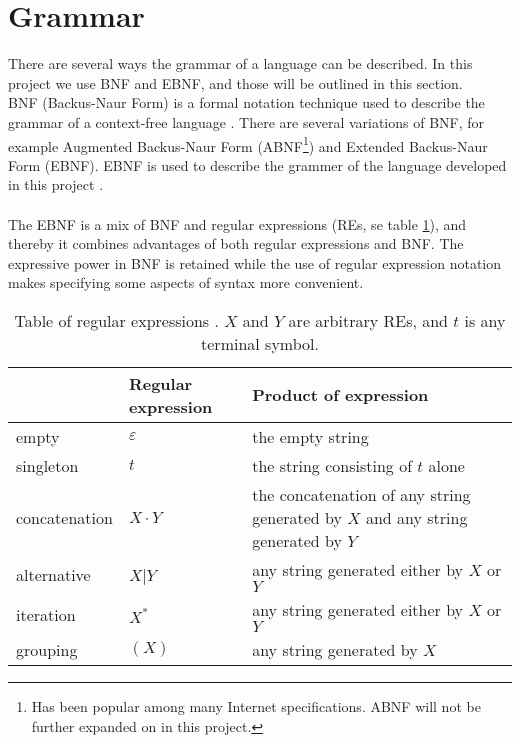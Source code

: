 \section{Grammar}
\label{sec:ebnf}

There are several ways the grammar of a language can be described. In this project we use BNF and EBNF, and those will be outlined in this section.\\ \indent
BNF (Backus-Naur Form) is a formal notation technique used to describe the grammar of a context-free language \cite{misc:ss}. There are several variations of BNF, for example Augmented Backus-Naur Form (ABNF\footnote{Has been popular among many
   Internet specifications. ABNF will not be further expanded on in this project.}) and Extended Backus-Naur Form (EBNF). EBNF is used to describe the grammer of the language developed in this project \cite{misc:spo}.\\
\\
The EBNF is a mix of BNF and regular expressions (REs, se table \ref{tab:re}), and thereby it combines advantages of both regular expressions and BNF. The expressive power in BNF is retained while the use of regular expression notation makes specifying some aspects of syntax more convenient.

\begin{center}
	\begin{table}[H]
    \begin{tabular}{ | l | l | p{6.5cm} |}
    \hline
     & Regular expression & Product of expression\\ \hline
    empty & $\varepsilon$ & the empty string\\ \hline
    singleton & $t$ & the string consisting of $t$ alone\\ \hline
    concatenation & $X \cdot Y$ & the concatenation of any string generated	by $X$ and any string generated by $Y$\\ \hline
		alternative & $X$|$Y$ & any string generated either by $X$ or $Y$\\ \hline
		iteration & $X^*$ & any string generated either by $X$ or $Y$\\ \hline
		grouping & $(X)$ & any string generated by $X$\\ \hline
    \end{tabular}
		\caption{Table of regular expressions \cite{misc:spo}. $X$ and $Y$ are arbitrary REs, and $t$ is any terminal symbol.}
		\label{tab:re}
	\end{table}
\end{center}

